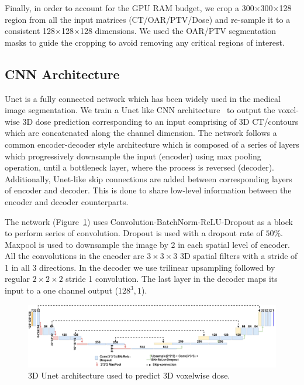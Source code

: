 \documentclass[10pt]{article}
\begin{document}
Finally, in order to account for the GPU RAM budget, we crop a 300$\times$300$\times$128 region from all the input matrices (CT/OAR/PTV/Dose) and re-sample it to a consistent 128$\times$128$\times$128 dimensions. We used the OAR/PTV segmentation masks to guide the cropping to avoid removing any critical regions of interest.

\subsection{CNN Architecture}
Unet is a fully connected network which has been widely used in the medical image segmentation. We train a Unet like CNN architecture~\cite{ronneberger2015unet,pix2pix2017} to output the voxel-wise 3D dose prediction corresponding to an input comprising of 3D CT/contours which are concatenated along the channel dimension. The network follows a common encoder-decoder style architecture which is composed of a series of layers which progressively downsample the input (encoder) using max pooling operation, until a bottleneck layer, where the process is reversed (decoder). Additionally, Unet-like skip connections are added between corresponding layers of encoder and decoder. This is done to share low-level information between the encoder and decoder counterparts.

The network (Figure~\ref{fig:network_arch}) uses Convolution-BatchNorm-ReLU-Dropout as a block to perform series of convolution. Dropout is used with a dropout rate of $50\%$. Maxpool is used to downsample the image by 2 in each spatial level of encoder. All the convolutions in the encoder are $3\times3\times3$ 3D spatial filters with a stride of 1 in all 3 directions. In the decoder we use trilinear upsampling followed by regular $2\times2\times2$ stride 1 convolution. The last layer in the decoder maps its input to a one channel output ($128^3, 1$).
\begin{figure}[htb!]
    \centering
    \includegraphics[width=\linewidth]{network_arch_1.pdf}%
    \caption{3D Unet architecture used to predict 3D voxelwise dose.}
    \label{fig:network_arch}
\end{figure}
\end{document}
